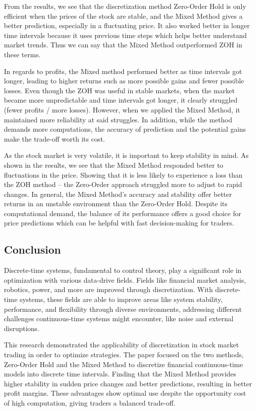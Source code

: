 \documentclass{article}
\begin{document}
From the results, we see that the discretization method Zero-Order Hold is only efficient when the prices of the stock are stable, and the Mixed Method gives a better prediction, especially in a fluctuating price. It also worked better in longer time intervals because it uses previous time steps which helps better understand market trends. Thus we can say that the Mixed Method outperformed ZOH in these terms.

In regards to profits, the Mixed method performed better as time intervals got longer, leading to higher returns such as more possible gains and fewer possible losses. Even though the ZOH was useful in stable markets, when the market became more unpredictable and time intervals got longer, it clearly struggled (fewer profits / more losses). However, when we applied the Mixed Method, it maintained more reliability at said struggles. In addition, while the method demands more computations, the accuracy of prediction and the potential gains make the trade-off worth its cost.

As the stock market is very volatile, it is important to keep stability in mind. As shown in the results, we see that the Mixed Method responded better to fluctuations in the price. Showing that it is less likely to experience a loss than the ZOH method – the Zero-Order approach struggled more to adjust to rapid changes.  
In general, the Mixed Method’s accuracy and stability offer better returns in an unstable environment than the Zero-Order Hold. Despite its computational demand, the balance of its performance offers a good choice for price predictions which can be helpful with fast decision-making for traders. 

\subsection{Conclusion}

Discrete-time systems, fundamental to control theory, play a significant role in optimization with various data-drive fields. Fields like financial market analysis, robotics, power, and more are improved through discretization. With discrete-time systems, these fields are able to improve areas like system stability, performance, and flexibility through diverse environments, addressing different challenges continuous-time systems might encounter, like noise and external disruptions.

This research demonstrated the applicability of discretization in stock market trading in order to optimize strategies. The paper focused on the two methods, Zero-Order Hold and the Mixed Method to discretize financial continuous-time models into discrete time intervals. Finding that the Mixed Method provides higher stability in sudden price changes and better predictions, resulting in better profit margins. These advantages show optimal use despite the opportunity cost of high computation, giving traders a balanced trade-off. 
\end{document}
